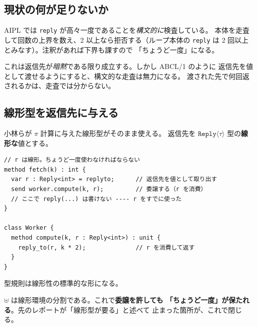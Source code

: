 \documentclass[11pt,a4paper]{ltjsarticle}
\theoremstyle{remark}
\newcommand{\ty}[1]{\ensuremath{\mathtt{#1}}}
\begin{document}
\subsection{現状の何が足りないか}

AIPL では \texttt{reply} が高々一度であることを\emph{構文的に}検査している。
本体を走査して回数の上界を数え、2 以上なら拒否する（ループ本体の
\texttt{reply} は 2 回以上とみなす）。注釈があれば下界も課すので
「ちょうど一度」になる。

これは返信先が\emph{暗黙}である限り成立する。しかし ABCL/1 のように
返信先を値として渡せるようにすると、構文的な走査は無力になる。
渡された先で何回返されるかは、走査では分からない。

\subsection{線形型を返信先に与える}

小林らが $\pi$ 計算に与えた線形型がそのまま使える。
返信先を \ty{Reply}$\langle\tau\rangle$ 型の\textbf{線形な}値とする。

\begin{lstlisting}[language=AIPL]
// r は線形。ちょうど一度使わなければならない
method fetch(k) : int {
  var r : Reply<int> = replyto;      // 返信先を値として取り出す
  send worker.compute(k, r);         // 委譲する（r を消費）
  // ここで reply(...) は書けない ---- r をすでに使った
}

class Worker {
  method compute(k, r : Reply<int>) : unit {
    reply_to(r, k * 2);              // r を消費して返す
  }
}
\end{lstlisting}

型規則は線形性の標準的な形になる。


$\uplus$ は線形環境の分割である。これで\textbf{委譲を許しても
「ちょうど一度」が保たれる}。先のレポートが「線形型が要る」と述べて
止まった箇所が、これで閉じる。
\end{document}
